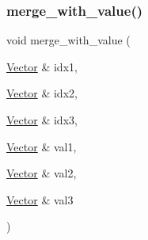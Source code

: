 \mbox{\label{vector_8_c_a2471b9bb8555afd2c10f48fc09ce2a06}} 
\subsubsection{\texorpdfstring{merge\+\_\+with\+\_\+value()}{merge\_with\_value()}}
{\footnotesize\ttfamily void merge\+\_\+with\+\_\+value (\begin{DoxyParamCaption}\item[{\mbox{\hyperlink{class_vector}{Vector}} \&}]{idx1,  }\item[{\mbox{\hyperlink{class_vector}{Vector}} \&}]{idx2,  }\item[{\mbox{\hyperlink{class_vector}{Vector}} \&}]{idx3,  }\item[{\mbox{\hyperlink{class_vector}{Vector}} \&}]{val1,  }\item[{\mbox{\hyperlink{class_vector}{Vector}} \&}]{val2,  }\item[{\mbox{\hyperlink{class_vector}{Vector}} \&}]{val3 }\end{DoxyParamCaption})}

